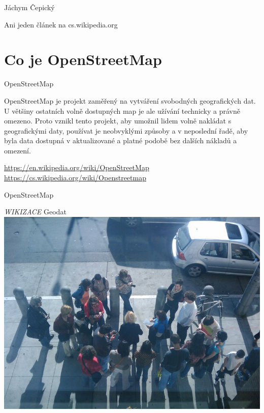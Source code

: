 \documentclass[xcolor=dvipsnames]{beamer}
\begin{document}
\begin{frame}{Jáchym Čepický}
    \begin{block}{}
        Ani jeden článek na cs.wikipedia.org
    \end{block}
\end{frame}

\section{Co je OpenStreetMap}

\begin{frame}{OpenStreetMap}
    \begin{block}{OpenStreetMap}
    je projekt zaměřený na vytváření svobodných geografických dat. U většiny
    ostatních volně dostupných map je ale užívání technicky a právně omezeno.
    Proto vznikl tento projekt, aby umožnil lidem volně nakládat s geografickými
    daty, používat je neobvyklými způsoby a v neposlední řadě, aby byla data
    dostupná v aktualizované a platné podobě bez dalších nákladů a omezení.
    \end{block}
    \href{https://en.wikipedia.org/wiki/OpenStreetMap}{https://en.wikipedia.org/wiki/OpenStreetMap}\\
    \href{https://cs.wikipedia.org/wiki/Openstreetmap}{https://cs.wikipedia.org/wiki/Openstreetmap}
\end{frame}

\begin{frame}{OpenStreetMap}
    \begin{center}
        {\em WIKIZACE} Geodat
        \includegraphics[width=\textheight]{images/mapping.jpg}
    \end{center}
\end{frame}
\end{document}
